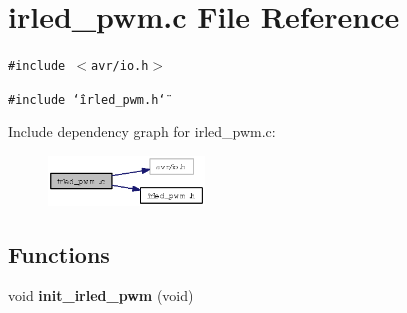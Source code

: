\section{irled\_\-pwm.c File Reference}
\label{irled__pwm_8c}
{\tt \#include $<$avr/io.h$>$}\par
{\tt \#include \char`\"{}irled\_\-pwm.h\char`\"{}}\par


Include dependency graph for irled\_\-pwm.c:\begin{figure}[H]
\begin{center}
\leavevmode
\includegraphics[width=118pt]{irled__pwm_8c__incl}
\end{center}
\end{figure}
\subsection*{Functions}
\begin{CompactItemize}
\item 
void {\bf init\_\-irled\_\-pwm} (void)
\end{CompactItemize}
